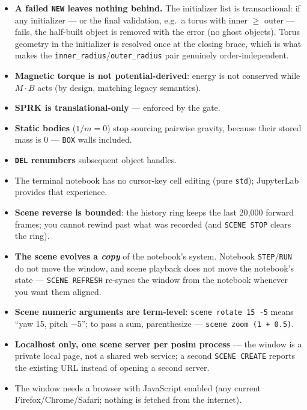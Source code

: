\documentclass[11pt]{article}
\newcommand{\code}[1]{\texttt{#1}}
\begin{document}
\begin{itemize}
      tracked wall indices renumbered, and \code{LIST} tags them
      \code{[wall: static, inverse\_mass=0]} so you can always tell
      which is which. Deleting a wall \textbf{dissolves} the box
      (\code{system.box} reads 0) but the surviving slabs stay tracked
      --- \code{LIST} keeps their \code{[wall]} tag, bare \code{BOX}
      reports the dissolved state, and \code{BOX <size>} /
      \code{BOX OFF} replaces / removes them without leaking an orphan
      slab.
\item \textbf{A failed \code{NEW} leaves nothing behind.} The
      initializer list is transactional: if any initializer --- or the
      final validation, e.g.\ a torus with inner $\ge$ outer --- fails,
      the half-built object is removed with the error (no ghost
      objects). Torus geometry in the initializer is resolved once at
      the closing brace, which is what makes the
      \code{inner\_radius}/\code{outer\_radius} pair genuinely
      order-independent.
\item \textbf{Magnetic torque is not potential-derived}: energy is not
      conserved while $M\!\cdot\!B$ acts (by design, matching legacy
      semantics).
\item \textbf{SPRK is translational-only} --- enforced by the gate.
\item \textbf{Static bodies} ($1/m = 0$) stop sourcing pairwise
      gravity, because their stored mass is 0 --- \code{BOX} walls
      included.
\item \textbf{\code{DEL} renumbers} subsequent object handles.
\item The terminal notebook has no cursor-key cell editing (pure
      \code{std}); JupyterLab provides that experience.
\item \textbf{Scene reverse is bounded}: the history ring keeps the
      last 20{,}000 forward frames; you cannot rewind past what was
      recorded (and \code{SCENE STOP} clears the ring).
\item \textbf{The scene evolves a \emph{copy}} of the notebook's
      system. Notebook \code{STEP}/\code{RUN} do not move the window,
      and scene playback does not move the notebook's state ---
      \code{SCENE REFRESH} re-syncs the window from the notebook
      whenever you want them aligned.
\item \textbf{Scene numeric arguments are term-level}:
      \code{scene rotate 15 -5} means ``yaw 15, pitch $-5$''; to pass a
      sum, parenthesize --- \code{scene zoom (1 + 0.5)}.
\item \textbf{Localhost only, one scene server per posim process} ---
      the window is a private local page, not a shared web service; a
      second \code{SCENE CREATE} reports the existing URL instead of
      opening a second server.
\item The window needs a browser with JavaScript enabled (any current
      Firefox/Chrome/Safari; nothing is fetched from the internet).
\end{itemize}
\end{document}
